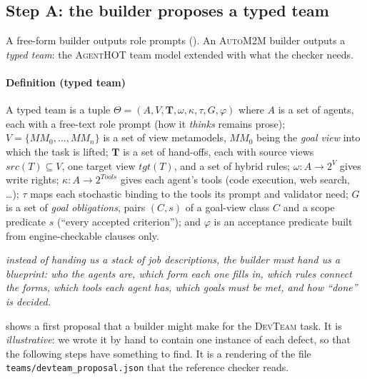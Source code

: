 \documentclass[10pt,a4paper]{article}
\newcommand{\tool}{\textsc{AgentHOT}}
\newcommand{\auto}{\textsc{AutoM2M}}
\newcommand{\Team}{\Theta}
\newcommand{\devteam}{\textsc{DevTeam}}
\newcommand{\MM}{\mathit{MM}}
\newcommand{\file}[1]{\texttt{#1}}
\newcommand{\plain}[1]{\par\smallskip\noindent{\sffamily\bfseries\color{thinkbar}In plain words:}\enspace\emph{#1}\par\smallskip}
\begin{document}
\subsection{Step A: the builder proposes a typed team}\label{sec:typed}

A free-form builder outputs role prompts (). An \auto{}
builder outputs a \emph{typed team}: the \tool{} team model extended with
what the checker needs.

\paragraph{Definition (typed team)} A typed team is a tuple
$\Team=(A,V,\mathbf{T},\omega,\kappa,\tau,G,\varphi)$ where
$A$ is a set of agents, each with a free-text role prompt (how it
\emph{thinks} remains prose);
$V=\{\MM_0,\dots,\MM_n\}$ is a set of view metamodels, $\MM_0$ being the
\emph{goal view} into which the task is lifted;
$\mathbf{T}$ is a set of hand-offs, each with source views
$\mathit{src}(T)\subseteq V$, one target view $\mathit{tgt}(T)$, and a set
of hybrid rules;
$\omega:A\to 2^V$ gives write rights;
$\kappa:A\to 2^{\mathit{Tools}}$ gives each agent's tools (code execution,
web search, \ldots);
$\tau$ maps each stochastic binding to the tools its prompt and validator
need;
$G$ is a set of \emph{goal obligations}, pairs $(C,s)$ of a goal-view class
$C$ and a scope predicate $s$ (``every accepted criterion'');
and $\varphi$ is an acceptance predicate built from engine-checkable
clauses only.

\plain{instead of handing us a stack of job descriptions, the builder must
hand us a blueprint: who the agents are, which form each one fills in,
which rules connect the forms, which tools each agent has, which goals must
be met, and how ``done'' is decided.}

 shows a first proposal that a builder might make for
the \devteam{} task. It is \emph{illustrative}: we wrote it by hand to
contain one instance of each defect, so that the following steps have
something to find. It is a rendering of the file
\file{teams/devteam_proposal.json} that the reference checker reads.
\end{document}
